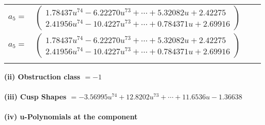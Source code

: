 \documentclass[1p]{elsarticle_modified}
\theoremstyle{definition}
\begin{document}
\begin{tabular}{m{7pt} m{180pt} m{7pt} m{180pt} }
\flushright $a_{5}=$&$\begin{pmatrix}1.78437 u^{74}-6.22270 u^{73}+\cdots+5.32082 u+2.42275\\2.41956 u^{74}-10.4227 u^{73}+\cdots+0.784371 u+2.69916\end{pmatrix}$\\ \flushright $a_{5}=$&$\begin{pmatrix}1.78437 u^{74}-6.22270 u^{73}+\cdots+5.32082 u+2.42275\\2.41956 u^{74}-10.4227 u^{73}+\cdots+0.784371 u+2.69916\end{pmatrix}$\\&\end{tabular}
\flushleft \textbf{(ii) Obstruction class $= -1$}\\~\\
\flushleft \textbf{(iii) Cusp Shapes $= -3.56995 u^{74}+12.8202 u^{73}+\cdots+11.6536 u-1.36638$}\\~\\
\newpage\renewcommand{\arraystretch}{1}
\flushleft \textbf{(iv) u-Polynomials at the component}\newline \\
\end{document}
